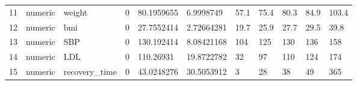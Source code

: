 \documentclass[11pt]{article}
\begin{document}
\begin{table}[]
\begin{tabular}{lllllllllll}
11 & numeric & weight         & 0          & 80.1959655     & 6.9998749               & 57.1              & 75.4    & 80.3   & 84.9  & 103.4 \\
12 & numeric & bmi            & 0          & 27.7552414     & 2.72664281              & 19.7              & 25.9    & 27.7   & 29.5  & 39.8  \\
13 & numeric & SBP            & 0          & 130.192414     & 8.08421168              & 104               & 125     & 130    & 136   & 158   \\
14 & numeric & LDL            & 0          & 110.26931      & 19.8722782              & 32                & 97      & 110    & 124   & 174   \\
15 & numeric & recovery\_time & 0          & 43.0248276     & 30.5053912              & 3                 & 28      & 38     & 49    & 365   \\ \hline
\end{tabular}
\end{table}

\newpage
\end{document}

